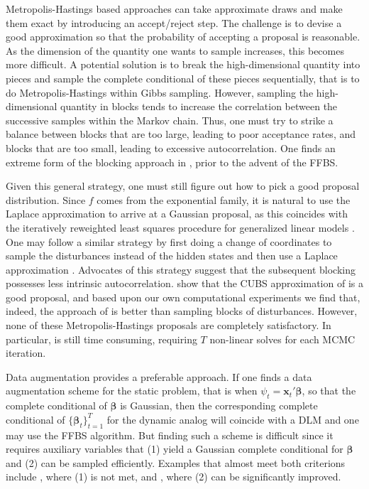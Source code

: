 \documentclass[12pt]{article}
\newcommand{\bbeta}{\boldsymbol{\beta}}
\newcommand{\vx}{\boldsymbol{x}}
\newcounter{parnum}
\newcommand{\npoint}{%
  \noindent\refstepcounter{parnum}%
  \makebox[0.5in][c]{\textbf{\arabic{parnum}.}} %
  \marginnote{\small\ttfamily\the\inputlineno}}
\renewcommand{\npoint}{}
\begin{document}
\npoint Metropolis-Hastings based approaches can take approximate draws and make
them exact by introducing an accept/reject step.  The challenge is to devise a
good approximation so that the probability of accepting a proposal is
reasonable.  As the dimension of the quantity one wants to sample increases,
this becomes more difficult.  A potential solution is to break the
high-dimensional quantity into pieces and sample the complete conditional of
these pieces sequentially, that is to do Metropolis-Hastings within Gibbs
sampling.  However, sampling the high-dimensional quantity in blocks tends to
increase the correlation between the successive samples within the Markov chain.
Thus, one must try to strike a balance between blocks that are too large,
leading to poor acceptance rates, and blocks that are too small, leading to
excessive autocorrelation.  One finds an extreme form of the blocking approach
in \cite{carlin-etal-1992}, prior to the advent of the FFBS.

\npoint Given this general strategy, one must still figure out how to pick a
good proposal distribution.  Since $f$ comes from the exponential family, it is
natural to use the Laplace approximation to arrive at a Gaussian proposal, as
this coincides with the iteratively reweighted least squares procedure for
generalized linear models \citep{gamerman-1997}.  One may follow a similar
strategy by first doing a change of coordinates to sample the disturbances
instead of the hidden states and then use a Laplace approximation
\citep{shephard-pitt-1997, gamerman-1998}.  Advocates of this strategy suggest
that the subsequent blocking possesses less intrinsic autocorrelation.
\cite{migon-etal-2013} show that the CUBS approximation of \cite{west-etal-1985}
is a good proposal, and based upon our own computational experiments we find
that, indeed, the approach of \cite{migon-etal-2013} is better than sampling
blocks of disturbances.  However, none of these Metropolis-Hastings proposals
are completely satisfactory.  In particular, \cite{migon-etal-2013} is still
time consuming, requiring $T$ non-linear solves for each MCMC iteration.

\npoint Data augmentation provides a preferable approach.  If one finds a data
augmentation scheme for the static problem, that is when $\psi_t = \vx_t'
\bbeta$, so that the complete conditional of $\bbeta$ is Gaussian, then the
corresponding complete conditional of $\{\bbeta_t\}_{t=1}^T$ for the dynamic
analog will coincide with a DLM and one may use the FFBS algorithm.
\npoint But finding such a scheme is difficult since it requires auxiliary
variables that (1) yield a Gaussian complete conditional for $\bbeta$ and (2)
can be sampled efficiently.  Examples that almost meet both criterions include
\cite{mcfadden-1974}, where (1) is not met, and \cite{holmes-held-2006}, where
(2) can be significantly improved.
\end{document}
